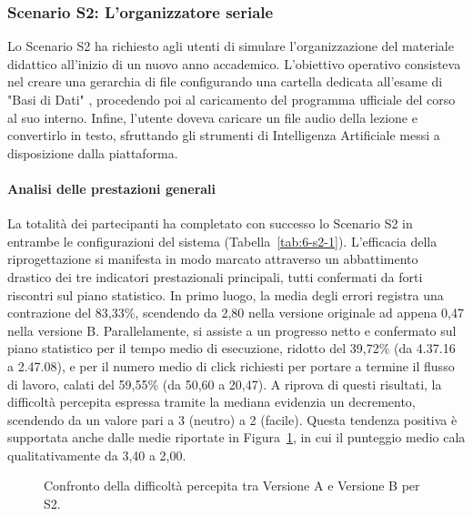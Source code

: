 \subsubsection{Scenario S2: L'organizzatore seriale}

Lo Scenario S2 ha richiesto agli utenti di simulare l'organizzazione del materiale didattico all'inizio di un nuovo anno accademico. L'obiettivo operativo consisteva nel creare una gerarchia di file configurando una cartella dedicata all'esame di "Basi di Dati" , procedendo poi al caricamento del programma ufficiale del corso al suo interno. Infine, l'utente doveva caricare un file audio della lezione e convertirlo in testo, sfruttando gli strumenti di Intelligenza Artificiale messi a disposizione dalla piattaforma.

\paragraph{Analisi delle prestazioni generali}

La totalità dei partecipanti ha completato con successo lo Scenario S2 in entrambe le configurazioni del sistema (Tabella~\ref{tab:6-s2-1}). L'efficacia della riprogettazione si manifesta in modo marcato attraverso un abbattimento drastico dei tre indicatori prestazionali principali, tutti confermati da forti riscontri sul piano statistico. In primo luogo, la media degli errori registra una contrazione del 83,33\%, scendendo da 2,80 nella versione originale ad appena 0,47 nella versione B. Parallelamente, si assiste a un progresso netto e confermato sul piano statistico per il tempo medio di esecuzione, ridotto del 39,72\% (da 4.37.16 a 2.47.08), e per il numero medio di click richiesti per portare a termine il flusso di lavoro, calati del 59,55\% (da 50,60 a 20,47). A riprova di questi risultati, la difficoltà percepita espressa tramite la mediana evidenzia un decremento, scendendo da un valore pari a 3 (neutro) a 2 (facile). Questa tendenza positiva è supportata anche dalle medie riportate in Figura~\ref{fig:6-s2-1}, in cui il punteggio medio cala qualitativamente da 3,40 a 2,00.

\begin{figure}[H]
	\centering
	\caption{Confronto della difficoltà percepita tra Versione A e Versione B per S2.}
	\label{fig:6-s2-1}
\end{figure}


